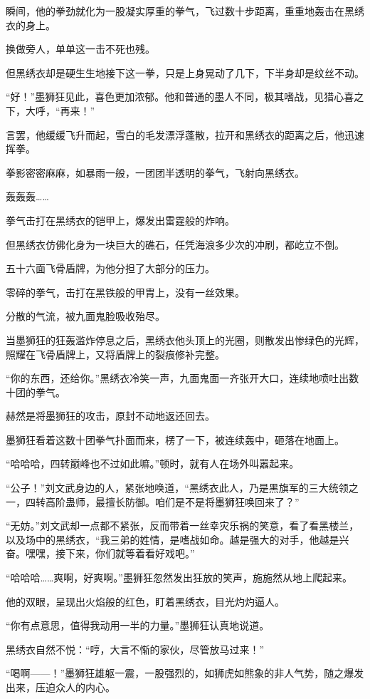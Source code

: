 \begin{this_body}
瞬间，他的拳劲就化为一股凝实厚重的拳气，飞过数十步距离，重重地轰击在黑绣衣的身上。

换做旁人，单单这一击不死也残。

但黑绣衣却是硬生生地接下这一拳，只是上身晃动了几下，下半身却是纹丝不动。

“好！”墨狮狂见此，喜色更加浓郁。他和普通的墨人不同，极其嗜战，见猎心喜之下，大呼，“再来！”

言罢，他缓缓飞升而起，雪白的毛发漂浮蓬散，拉开和黑绣衣的距离之后，他迅速挥拳。

拳影密密麻麻，如暴雨一般，一团团半透明的拳气，飞射向黑绣衣。

轰轰轰……

拳气击打在黑绣衣的铠甲上，爆发出雷霆般的炸响。

但黑绣衣仿佛化身为一块巨大的礁石，任凭海浪多少次的冲刷，都屹立不倒。

五十六面飞骨盾牌，为他分担了大部分的压力。

零碎的拳气，击打在黑铁般的甲胄上，没有一丝效果。

分散的气流，被九面鬼脸吸收殆尽。

当墨狮狂的狂轰滥炸停息之后，黑绣衣他头顶上的光圈，则散发出惨绿色的光辉，照耀在飞骨盾牌上，又将盾牌上的裂痕修补完整。

“你的东西，还给你。”黑绣衣冷笑一声，九面鬼面一齐张开大口，连续地喷吐出数十团的拳气。

赫然是将墨狮狂的攻击，原封不动地返还回去。

墨狮狂看着这数十团拳气扑面而来，楞了一下，被连续轰中，砸落在地面上。

“哈哈哈，四转巅峰也不过如此嘛。”顿时，就有人在场外叫嚣起来。

“公子！”刘文武身边的人，紧张地唤道，“黑绣衣此人，乃是黑旗军的三大统领之一，四转高阶蛊师，最擅长防御。咱们是不是将墨狮狂唤回来了？”

“无妨。”刘文武却一点都不紧张，反而带着一丝幸灾乐祸的笑意，看了看黑楼兰，以及场中的黑绣衣，“我三弟的姓情，是嗜战如命。越是强大的对手，他越是兴奋。嘿嘿，接下来，你们就等着看好戏吧。”

“哈哈哈……爽啊，好爽啊。”墨狮狂忽然发出狂放的笑声，施施然从地上爬起来。

他的双眼，呈现出火焰般的红色，盯着黑绣衣，目光灼灼逼人。

“你有点意思，值得我动用一半的力量。”墨狮狂认真地说道。

黑绣衣自然不悦：“哼，大言不惭的家伙，尽管放马过来！”

“喝啊——！”墨狮狂雄躯一震，一股强烈的，如狮虎如熊象的非人气势，随之爆发出来，压迫众人的内心。


\end{this_body}
